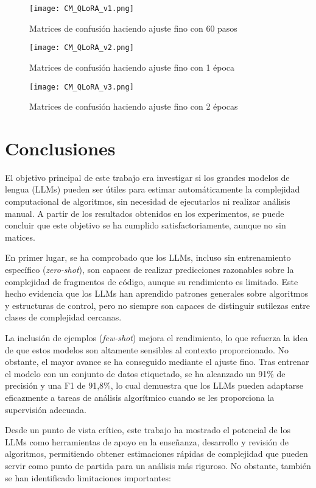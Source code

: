 \documentclass[12pt,twoside]{article}
\begin{document}
\begin{figure}[H]
  \centering
    \texttt{[image: CM\_QLoRA\_v1.png]}
  \caption{Matrices de confusión haciendo ajuste fino con 60 pasos}
  \label{fig:confmat_QLoRA1}
\end{figure}

\begin{figure}[H]
  \centering
    \texttt{[image: CM\_QLoRA\_v2.png]}
  \caption{Matrices de confusión haciendo ajuste fino con 1 época}
  \label{fig:confmat_QLoRA2}
\end{figure}

\begin{figure}[H]
  \centering
    \texttt{[image: CM\_QLoRA\_v3.png]}
  \caption{Matrices de confusión haciendo ajuste fino con 2 épocas}
  \label{fig:confmat_QLoRA3}
\end{figure}


\section{Conclusiones}
El objetivo principal de este trabajo era investigar si los grandes modelos de lengua (LLMs) pueden ser útiles para estimar automáticamente la complejidad computacional de algoritmos, sin necesidad de ejecutarlos ni realizar análisis manual. A partir de los resultados obtenidos en los experimentos, se puede concluir que este objetivo se ha cumplido satisfactoriamente, aunque no sin matices.

En primer lugar, se ha comprobado que los LLMs, incluso sin entrenamiento específico (\textit{zero-shot}), son capaces de realizar predicciones razonables sobre la complejidad de fragmentos de código, aunque su rendimiento es limitado. Este hecho evidencia que los LLMs han aprendido patrones generales sobre algoritmos y estructuras de control, pero no siempre son capaces de distinguir sutilezas entre clases de complejidad cercanas.

La inclusión de ejemplos (\textit{few-shot}) mejora el rendimiento, lo que refuerza la idea de que estos modelos son altamente sensibles al contexto proporcionado. No obstante, el mayor avance se ha conseguido mediante el ajuste fino. Tras entrenar el modelo con un conjunto de datos etiquetado, se ha alcanzado un 91\% de precisión y una F1 de 91,8\%, lo cual demuestra que los LLMs pueden adaptarse eficazmente a tareas de análisis algorítmico cuando se les proporciona la supervisión adecuada.

Desde un punto de vista crítico, este trabajo ha mostrado el potencial de los LLMs como herramientas de apoyo en la enseñanza, desarrollo y revisión de algoritmos, permitiendo obtener estimaciones rápidas de complejidad que pueden servir como punto de partida para un análisis más riguroso. No obstante, también se han identificado limitaciones importantes:
\end{document}
